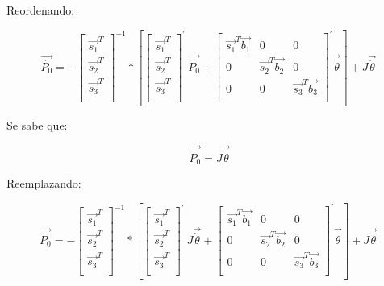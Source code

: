         Reordenando:
        
         \[ \overrightarrow{\ddot{P_{0}}}=- \left[ \begin{matrix}
        \overrightarrow{s_{1}}^{T}\\
        \overrightarrow{s_{2}}^{T}\\
        \overrightarrow{s_{3}}^{T}\\
        \end{matrix}
         \right] ^{-1}\ast \left[  \left[ \begin{matrix}
        \overrightarrow{s_{1}}^{T}\\
        \overrightarrow{s_{2}}^{T}\\
        \overrightarrow{s_{3}}^{T}\\
        \end{matrix}
         \right] ^{'}~\overrightarrow{\dot{P_{0}}}+ \left[ \begin{matrix}
        \overrightarrow{s_{1}}^{T}\overrightarrow{b_{1}}  &  0  &  0\\
        0  &  \overrightarrow{s_{2}}^{T}\overrightarrow{b_{2}}  &  0\\
        0  &  0  &  \overrightarrow{s_{3}}^{T}\overrightarrow{b_{3}}\\
        \end{matrix}
         \right] ^{'}\overrightarrow{\dot{ \theta }} \right] +J\overrightarrow{\ddot{ \theta }}~ \] \par
        
        Se sabe que:
        
         \[ \overrightarrow{\dot{P_{0}}}=J\overrightarrow{\dot{ \theta }} \] \par
        
        Reemplazando: 
        
         \[ \overrightarrow{\ddot{P_{0}}}=- \left[ \begin{matrix}
        \overrightarrow{s_{1}}^{T}\\
        \overrightarrow{s_{2}}^{T}\\
        \overrightarrow{s_{3}}^{T}\\
        \end{matrix}
         \right] ^{-1}\ast \left[  \left[ \begin{matrix}
        \overrightarrow{s_{1}}^{T}\\
        \overrightarrow{s_{2}}^{T}\\
        \overrightarrow{s_{3}}^{T}\\
        \end{matrix}
         \right] ^{'}~J\overrightarrow{\dot{ \theta }}+ \left[ \begin{matrix}
        \overrightarrow{s_{1}}^{T}\overrightarrow{b_{1}}  &  0  &  0\\
        0  &  \overrightarrow{s_{2}}^{T}\overrightarrow{b_{2}}  &  0\\
        0  &  0  &  \overrightarrow{s_{3}}^{T}\overrightarrow{b_{3}}\\
        \end{matrix}
         \right] ^{'}\overrightarrow{\dot{ \theta }} \right] +J\overrightarrow{\ddot{ \theta }}~ \] \par
        
